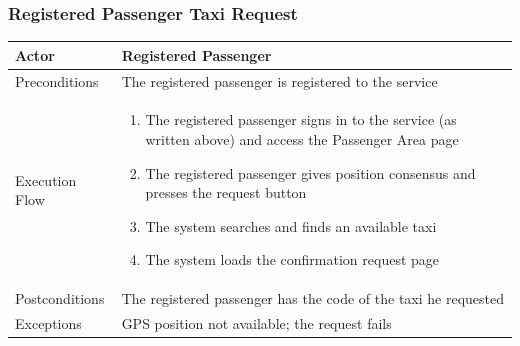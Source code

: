 		\subsubsection{Registered Passenger Taxi Request}
		\begin{center}
			\begin{tabular}{ | l | p{8cm} |}
				\hline
				Actor &  Registered Passenger	\\ \hline
				Preconditions & The registered passenger is registered to the service	\\ \hline
				Execution Flow & \begin{enumerate}
					\item The registered passenger signs in to the service (as written above) and access the Passenger Area page
					\item The registered passenger gives position consensus and presses the request button
					\item The system searches and finds an available taxi
					\item The system loads the confirmation request page
				\end{enumerate}		\\ \hline
				Postconditions & The registered passenger has the code of the taxi he requested	\\ \hline
				Exceptions & GPS position not available; the request fails \\ \hline
			\end{tabular}
		\end{center}